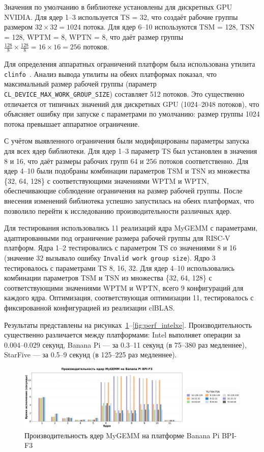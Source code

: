 Значения по умолчанию в библиотеке установлены для дискретных GPU NVIDIA. Для ядер 1--3 используется TS = 32, что создаёт рабочие группы размером $32 \times 32 = 1024$ потока. Для ядер 6--10 используются TSM = 128, TSN = 128, WPTM = 8, WPTN = 8, что даёт размер группы $\frac{128}{8} \times \frac{128}{8} = 16 \times 16 = 256$ потоков.

Для определения аппаратных ограничений платформ была использована утилита \texttt{clinfo}~\cite{clinfo}. Анализ вывода утилиты на обеих платформах показал, что максимальный размер рабочей группы (параметр \texttt{CL\_DEVICE\_MAX\_WORK\_GROUP\_SIZE}) составляет 512 потоков. Это существенно отличается от типичных значений для дискретных GPU (1024--2048 потоков), что объясняет ошибку при запуске с параметрами по умолчанию: размер группы 1024 потока превышает аппаратное ограничение.

С учётом выявленного ограничения были модифицированы параметры запуска для всех ядер библиотеки. Для ядер 1--3 параметр TS был установлен в значения 8 и 16, что даёт размеры рабочих групп 64 и 256 потоков соответственно. Для ядер 4--10 были подобраны комбинации параметров TSM и TSN из множества \{32, 64, 128\} с соответствующими значениями WPTM и WPTN, обеспечивающие соблюдение ограничения на размер рабочей группы. После внесения изменений библиотека успешно запустилась на обеих платформах, что позволило перейти к исследованию производительности различных ядер.

Для тестирования использовались 11 реализаций ядра MyGEMM с параметрами, адаптированными под ограничение размера рабочей группы для RISC-V платформ. Ядра 1--2 тестировались с параметром TS со значениями 8 и 16 (значение 32 вызывало ошибку \texttt{Invalid work group size}). Ядро 3 тестировалось с параметрами TS 8, 16, 32. Для ядер 4--10 использовались комбинации параметров TSM и TSN из множества \{32, 64, 128\} с соответствующими значениями WPTM и WPTN, всего 9 конфигураций для каждого ядра. Оптимизация, соответствующая оптимизации 11, тестировалось с фиксированной конфигурацией из реализации clBLAS.

Результаты представлены на рисунках~\ref{fig:perf_bananapi}--\ref{fig:perf_intelxe}. Производительность существенно различается между платформами: Intel выполняет операции за 0.004--0.029 секунд, Banana Pi --- за 0.3--11 секунд (в 75--380 раз медленнее), StarFive --- за 0.5--9 секунд (в 125--225 раз медленнее).

\begin{figure}[H]
\centering
\includegraphics[width=1\textwidth]{figures/banana_pi.png}
\caption{Производительность ядер MyGEMM на платформе Banana Pi BPI-F3}
\label{fig:perf_bananapi}
\end{figure}

